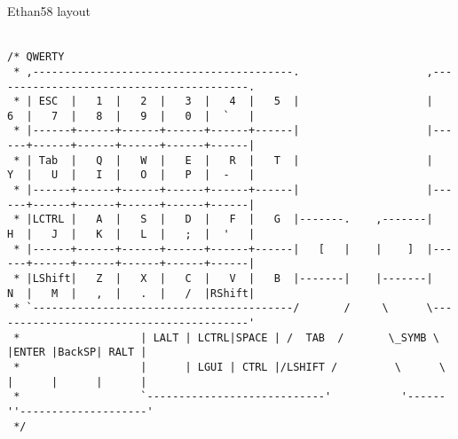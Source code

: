 \documentclass[12pt]{report}
\begin{document}
%
Ethan58 layout
\\
\\
    \begin{verbatim}
/* QWERTY
 * ,-----------------------------------------.                    ,-----------------------------------------.
 * | ESC  |   1  |   2  |   3  |   4  |   5  |                    |   6  |   7  |   8  |   9  |   0  |  `   |
 * |------+------+------+------+------+------|                    |------+------+------+------+------+------|
 * | Tab  |   Q  |   W  |   E  |   R  |   T  |                    |   Y  |   U  |   I  |   O  |   P  |  -   |
 * |------+------+------+------+------+------|                    |------+------+------+------+------+------|
 * |LCTRL |   A  |   S  |   D  |   F  |   G  |-------.    ,-------|   H  |   J  |   K  |   L  |   ;  |  '   |
 * |------+------+------+------+------+------|   [   |    |    ]  |------+------+------+------+------+------|
 * |LShift|   Z  |   X  |   C  |   V  |   B  |-------|    |-------|   N  |   M  |   ,  |   .  |   /  |RShift|
 * `-----------------------------------------/       /     \      \-----------------------------------------'
 *                   | LALT | LCTRL|SPACE | /  TAB  /       \_SYMB \  |ENTER |BackSP| RALT |
 *                   |      | LGUI | CTRL |/LSHIFT /         \      \ |      |      |      |
 *                   `----------------------------'           '------''--------------------'
 */
\end{verbatim}
\newpage
\end{document}
